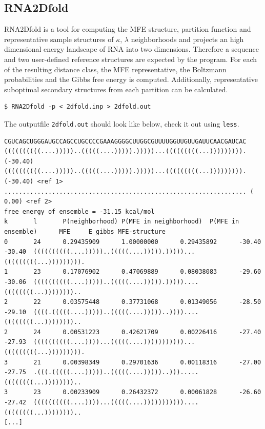 \documentclass[a4paper]{article}
\begin{document}
\subsection{RNA2Dfold}
RNA2Dfold is a tool for computing the MFE structure, partition function and
 representative sample structures of $\kappa$, $\lambda$ neighborhoods and projects an high 
dimensional energy landscape of RNA into two dimensions. Therefore a sequence 
and two user-defined reference structures are expected by the program. 
For each of the resulting distance class, the MFE representative, the 
Boltzmann probabilities and the Gibbs free energy is computed. Additionally, 
representative suboptimal secondary structures from each partition can be calculated. 

\begin{verbatim}
$ RNA2Dfold -p < 2dfold.inp > 2dfold.out
\end{verbatim}

The outputfile \texttt{2dfold.out} should look like below, check it out using \texttt{less}. 
\begin{tiny}
\begin{verbatim}
CGUCAGCUGGGAUGCCAGCCUGCCCCGAAAGGGGCUUGGCGUUUUGGUUGUUGAUUCAACGAUCAC
((((((((((....)))))..(((((....))))).)))))...(((((((((...))))))))). (-30.40)
((((((((((....)))))..(((((....))))).)))))...(((((((((...))))))))). (-30.40) <ref 1>
.................................................................. (  0.00) <ref 2>
free energy of ensemble = -31.15 kcal/mol
k       l       P(neighborhood) P(MFE in neighborhood)  P(MFE in ensemble)      MFE     E_gibbs MFE-structure
0       24      0.29435909      1.00000000      0.29435892      -30.40  -30.40  ((((((((((....)))))..(((((....))))).)))))...(((((((((...))))))))).
1       23      0.17076902      0.47069889      0.08038083      -29.60  -30.06  ((((((((((....)))))..(((((....))))).)))))....((((((((...))))))))..
2       22      0.03575448      0.37731068      0.01349056      -28.50  -29.10  ((((.(((((....)))))..(((((....)))))..))))....((((((((...))))))))..
2       24      0.00531223      0.42621709      0.00226416      -27.40  -27.93  ((((((((((....))))...(((((....)))))))))))...(((((((((...))))))))).
3       21      0.00398349      0.29701636      0.00118316      -27.00  -27.75  .(((.(((((....)))))..(((((....)))))..))).....((((((((...))))))))..
3       23      0.00233909      0.26432372      0.00061828      -26.60  -27.42  ((((((((((....))))...(((((....)))))))))))....((((((((...))))))))..
[...]
\end{verbatim}
\end{tiny}
\end{document}
